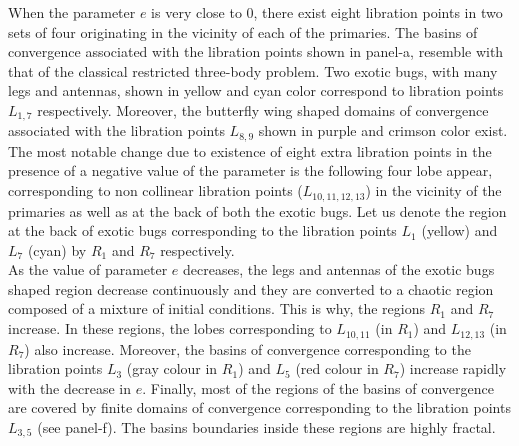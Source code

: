 \documentclass[preprint,fleqn,5p,numbers,sort&compress]{elsarticle}
\begin{document}
When the parameter $e$ is very close to $0$, there exist eight libration
points in two sets of four originating in the vicinity of each of the
primaries. The basins of convergence associated with the libration points
shown in panel-a, resemble with that of the classical restricted three-body problem.
Two exotic bugs, with many legs and antennas, shown in yellow and cyan color correspond to libration points $L_{1,7}$ respectively. Moreover,
the butterfly wing shaped domains of convergence associated with
the libration points $L_{8,9}$ shown in purple and crimson color
exist. The most notable change due to existence of eight extra libration
points in the presence of a negative value of the parameter is the following four lobe
appear, corresponding to non collinear libration points ($L_{10,11,12,13}$) in the vicinity of the primaries
as well as at the back of both the exotic bugs. Let us denote the region at the
back of exotic bugs corresponding to the libration points $L_1$ (yellow)
and $L_7$ (cyan) by $R_1$ and $R_7$ respectively.\\
As the value of parameter $e$ decreases, the legs and antennas
of the exotic bugs shaped region decrease continuously and they are converted to \textcolor[rgb]{1.00,0.00,0.50}{a}
chaotic region composed of a mixture of initial conditions. This is why,
the regions $R_1$ and $R_7$ increase. In these regions, the lobes corresponding
to $L_{10, 11}$ (in $R_1$) and $L_{12, 13}$ (in $R_7$) also increase.
Moreover, the basins of convergence corresponding to the libration
points $L_3$ (gray colour in $R_1$) and $L_{5}$ (red colour in $R_7$)
increase rapidly with the decrease in $e$. Finally, most of the
regions of the basins of convergence are covered by finite domains of convergence
corresponding to the libration points $L_{3,5}$ (see panel-f). The basins boundaries
inside these regions are highly fractal.
\end{document}
